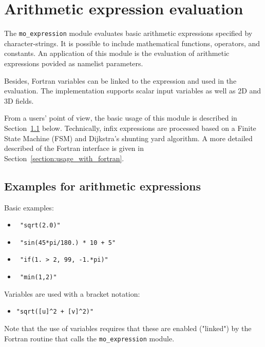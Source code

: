 \section{Arithmetic expression evaluation}

The \texttt{mo\_expression} module evaluates basic arithmetic
expressions specified by character-strings.
%
It is possible to include mathematical functions, operators, and
constants. 
An application of this module is the evaluation of arithmetic
expressions povided as namelist parameters.

Besides, Fortran variables can be linked to the expression and used in
the evaluation.
The implementation supports scalar input variables as well as 2D and
3D fields.

From a users' point of view, the basic usage of this module is
described in Section~\ref{section:examples_for_arithmetic_expressions}
below.
Technically, infix expressions are processed based on a Finite State
Machine (FSM) and Dijkstra's shunting yard algorithm.
A more detailed described of the Fortran interface is given in
Section~\ref{section:usage_with_fortran}.


\subsection{Examples for arithmetic expressions}
\label{section:examples_for_arithmetic_expressions}

Basic examples:
\begin{itemize}
  \item \texttt{ "sqrt(2.0)" }
  \item \texttt{ "sin(45*pi/180.) * 10 + 5" }
  \item \texttt{ "if(1. > 2, 99, -1.*pi)" }
  \item \texttt{ "min(1,2)" }
\end{itemize}

Variables are used with a bracket notation:
\begin{itemize}
 \item \verb;"sqrt([u]^2 + [v]^2)";
\end{itemize}
Note that the use of variables requires that these are enabled
("linked") by the Fortran routine that calls the
\texttt{mo\_expression} module.


